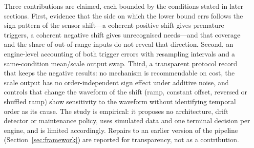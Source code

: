 Three contributions are claimed, each bounded by the conditions stated in later sections. First, evidence that the side on which the lower bound errs follows the sign pattern of the sensor shift---a coherent positive shift gives premature triggers, a coherent negative shift gives unrecognised needs---and that coverage and the share of out-of-range inputs do not reveal that direction. Second, an engine-level accounting of both trigger errors with resampling intervals and a same-condition mean/scale output swap. Third, a transparent protocol record that keeps the negative results: no mechanism is recommendable on cost, the scale output has no order-independent sign effect under additive noise, and controls that change the waveform of the shift (ramp, constant offset, reversed or shuffled ramp) show sensitivity to the waveform without identifying temporal order as its cause. The study is empirical: it proposes no architecture, drift detector or maintenance policy, uses simulated data and one terminal decision per engine, and is limited accordingly. Repairs to an earlier version of the pipeline (Section~\ref{sec:framework}) are reported for transparency, not as a contribution.

